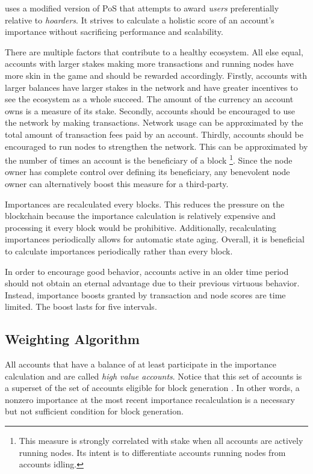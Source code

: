 \codenamespace uses a modified version of PoS that attempts to award \emph{users} preferentially relative to \emph{hoarders}.
It strives to calculate a holistic score of an account's importance without sacrificing performance and scalability.

There are multiple factors that contribute to a healthy ecosystem.
All else equal, accounts with larger stakes making more transactions and running nodes have more skin in the game and should be rewarded accordingly.
Firstly, accounts with larger balances have larger stakes in the network and have greater incentives to see the ecosystem as a whole succeed.
The amount of the currency an account owns is a measure of its stake.
Secondly, accounts should be encouraged to use the network by making transactions.
Network usage can be approximated by the total amount of transaction fees paid by an account.
Thirdly, accounts should be encouraged to run nodes to strengthen the network.
This can be approximated by the number of times an account is the beneficiary of a block
\footnote{
	This measure is strongly correlated with stake when all accounts are actively running nodes.
	Its intent is to differentiate accounts running nodes from accounts idling.
}.
Since the node owner has complete control over defining its beneficiary, any benevolent node owner can alternatively boost this measure for a third-party.

Importances are recalculated every  blocks.
This reduces the pressure on the blockchain because the importance calculation is relatively expensive and processing it every block would be prohibitive.
Additionally, recalculating importances periodically allows for automatic state aging.
Overall, it is beneficial to calculate importances periodically rather than every block.

In order to encourage good behavior, accounts active in an older time period should not obtain an eternal advantage due to their previous virtuous behavior.
Instead, importance boosts granted by transaction and node scores are time limited.
The boost lasts for five  intervals.

\subsection{Weighting Algorithm}
\label{sec:consensus:weighting}

All accounts that have a balance of at least  participate in the importance calculation and are called \emph{high value accounts}.
Notice that this set of accounts is a superset of the set of accounts eligible for block generation .
In other words, a nonzero importance at the most recent importance recalculation is a necessary but not sufficient condition for block generation.

